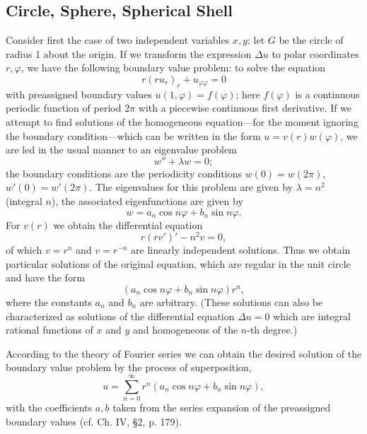 \subsection{Circle, Sphere, Spherical Shell}
Consider first the case of two independent variables $x,y$; let $G$ be the circle of radius 1 about the origin. If we transform the expression $\Delta u$ to polar coordinates $r,\varphi$, we have the following boundary value problem: to solve the equation
\[
r(ru_r)_r+u_{\varphi\varphi}=0
\]
with preassigned boundary values $u(1,\varphi)=f(\varphi)$; here $f(\varphi)$ is a continuous periodic function of period $2\pi$ with a piecewise continuous first derivative. If we attempt to find solutions of the homogeneous equation---for the moment ignoring the boundary condition---which can be written in the form $u=v(r)w(\varphi)$, we are led in the usual manner to an eigenvalue problem
\[
w''+\lambda w=0;
\]
the boundary conditions are the periodicity conditions $w(0)=w(2\pi)$, $w'(0)=w'(2\pi)$. The eigenvalues for this problem are given by $\lambda=n^2$ (integral $n$), the associated eigenfunctions are given by
\[
w=a_n\cos n\varphi+b_n\sin n\varphi.
\]
For $v(r)$ we obtain the differential equation
\[
r(rv')'-n^2v=0,
\]
of which $v=r^n$ and $v=r^{-n}$ are linearly independent solutions. Thus we obtain particular solutions of the original equation, which are regular in the unit circle and have the form
\[
(a_n\cos n\varphi+b_n\sin n\varphi)r^n,
\]
where the constants $a_n$ and $b_n$ are arbitrary. (These solutions can also be characterized as solutions of the differential equation $\Delta u=0$ which are integral rational functions of $x$ and $y$ and homogeneous of the $n$-th degree.)

According to the theory of Fourier series we can obtain the desired solution of the boundary value problem by the process of superposition,
\[
u=\sum_{n=0}^{\infty}r^n(a_n\cos n\varphi+b_n\sin n\varphi),
\]
with the coefficients $a,b$ taken from the series expansion of the preassigned boundary values (cf. Ch. IV, \S2, p. 179).


